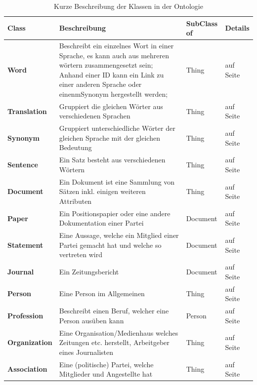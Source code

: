 \documentclass[
    11pt,
    latin1,
    a4paper,
    oneside
]{scrreprt}
\begin{document}
\begin{table}[H]
  \centering
  \begin{tabular}{ | l | p{4cm} | l | l| }
    \hline
    \textbf{Class} & \textbf{Beschreibung} & \textbf{SubClass of} & \textbf{Details} \\ \hline
    \textbf{Word} & Beschreibt ein einzelnes Wort in einer Sprache, es kann auch aus mehreren w\"ortern zusammengesetzt sein; Anhand einer ID kann ein Link zu einer anderen Sprache oder einenmSynonym hergestellt werden; & Thing & \nameref{sec:class_word} auf Seite \pageref{sec:class_word} \\ \hline
    \textbf{Translation} & Gruppiert die gleichen W\"orter aus verschiedenen Sprachen & Thing & \nameref{sec:class_translation} auf Seite \pageref{sec:class_translation} \\ \hline
    \textbf{Synonym} & Gruppiert unterschiedliche W\"orter der gleichen Sprache mit der gleichen Bedeutung & Thing & \nameref{sec:class_synonym} auf Seite \pageref{sec:class_synonym} \\ \hline
    \textbf{Sentence} & Ein Satz besteht aus verschiedenen W\"ortern & Thing & \nameref{sec:class_sentence} auf Seite \pageref{sec:class_sentence} \\ \hline
    \textbf{Document} & Ein Dokument ist eine Sammlung von S\"atzen inkl. einigen weiteren Attributen & Thing & \nameref{sec:class_document} auf Seite \pageref{sec:class_document} \\ \hline
    \textbf{Paper} & Ein Positionspapier oder eine andere Dokumentation einer Partei & Document & \nameref{sec:class_paper} auf Seite \pageref{sec:class_paper} \\ \hline
    \textbf{Statement} & Eine Aussage, welche ein Mitglied einer Partei gemacht hat und welche so vertreten wird & Document & \nameref{sec:class_statement} auf Seite \pageref{sec:class_statement} \\ \hline
    \textbf{Journal} & Ein Zeitungsbericht & Document & \nameref{sec:class_journal} auf Seite \pageref{sec:class_journal} \\ \hline
    \textbf{Person} & Eine Person im Allgemeinen & Thing & \nameref{sec:class_person} auf Seite \pageref{sec:class_person} \\ \hline
    \textbf{Profession} & Beschreibt einen Beruf, welcher eine Person aus\"uben kann & Person & \nameref{sec:class_profession} auf Seite \pageref{sec:class_profession} \\ \hline
    \textbf{Organization} & Eine Organisation/Medienhaus welches Zeitungen etc. herstellt, Arbeitgeber eines Journalisten & Thing & \nameref{sec:class_organization} auf Seite \pageref{sec:class_organization} \\ \hline
    \textbf{Association} & Eine (politische) Partei, welche Mitglieder und Angestellte hat & Thing & \nameref{sec:class_association} auf Seite \pageref{sec:class_association} \\ \hline
  \end{tabular}
  \caption{Kurze Beschreibung der Klassen in der Ontologie}
  \label{tbl:classes}
\end{table}
\end{document}
